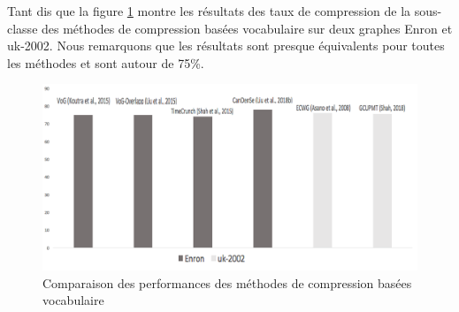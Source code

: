 		Tant dis que la figure \ref{comparaisonVoc} 	montre les résultats des taux de compression de la sous-classe des méthodes de compression basées vocabulaire sur deux graphes Enron et uk-2002. Nous remarquons que les résultats sont presque équivalents pour toutes les méthodes et sont autour de 75\%.
				
				\begin{figure}[H]
				
				\includegraphics[scale=0.39]{ressources/image/vocabulary.png} 
					\centering
					\caption{Comparaison des performances des méthodes de compression basées vocabulaire}
					\label{comparaisonVoc}
				\end{figure}
			
			

